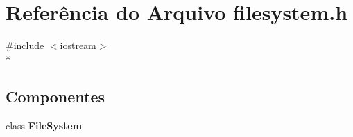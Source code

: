 \section{Referência do Arquivo filesystem.\+h}
\label{filesystem_8h}
{\ttfamily \#include $<$iostream$>$}\\*
\subsection*{Componentes}
\begin{DoxyCompactItemize}
\item 
class {\bf File\+System}
\end{DoxyCompactItemize}
